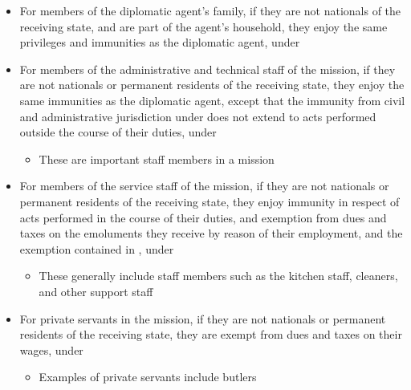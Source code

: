 \begin{itemize}
    \item For members of the diplomatic agent's family, if they are not nationals of the receiving state, and are part of the agent's household, they enjoy the same privileges and immunities as the diplomatic agent, under 
    \item For members of the administrative and technical staff of the mission, if they are not nationals or permanent residents of the receiving state, they enjoy the same immunities as the diplomatic agent, except that the immunity from civil and administrative jurisdiction under  does not extend to acts performed outside the course of their duties, under 
    \begin{itemize}
        \item These are important staff members in a mission
    \end{itemize}
    \item For members of the service staff of the mission, if they are not nationals or permanent residents of the receiving state, they enjoy immunity in respect of acts performed in the course of their duties, and exemption from dues and taxes on the emoluments they receive by reason of their employment, and the exemption contained in , under 
    \begin{itemize}
        \item These generally include staff members such as the kitchen staff, cleaners, and other support staff
    \end{itemize}
    \item For private servants in the mission, if they are not nationals or permanent residents of the receiving state, they are exempt from dues and taxes on their wages, under 
    \begin{itemize}
        \item Examples of private servants include butlers
    \end{itemize}
\end{itemize}

